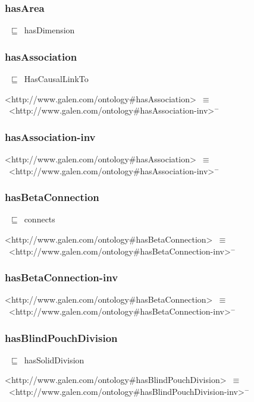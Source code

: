 \documentclass{article}
\begin{document}
\subsubsection*{hasArea}

~\ensuremath{\sqsubseteq}~hasDimension

\subsubsection*{hasAssociation}

~\ensuremath{\sqsubseteq}~HasCausalLinkTo

<http://www.galen.com/ontology#hasAssociation>~\ensuremath{\equiv}~<http://www.galen.com/ontology#hasAssociation-inv>\ensuremath{^-}

\subsubsection*{hasAssociation-inv}

<http://www.galen.com/ontology#hasAssociation>~\ensuremath{\equiv}~<http://www.galen.com/ontology#hasAssociation-inv>\ensuremath{^-}

\subsubsection*{hasBetaConnection}

~\ensuremath{\sqsubseteq}~connects

<http://www.galen.com/ontology#hasBetaConnection>~\ensuremath{\equiv}~<http://www.galen.com/ontology#hasBetaConnection-inv>\ensuremath{^-}

\subsubsection*{hasBetaConnection-inv}

<http://www.galen.com/ontology#hasBetaConnection>~\ensuremath{\equiv}~<http://www.galen.com/ontology#hasBetaConnection-inv>\ensuremath{^-}

\subsubsection*{hasBlindPouchDivision}

~\ensuremath{\sqsubseteq}~hasSolidDivision

<http://www.galen.com/ontology#hasBlindPouchDivision>~\ensuremath{\equiv}~<http://www.galen.com/ontology#hasBlindPouchDivision-inv>\ensuremath{^-}
\end{document}
